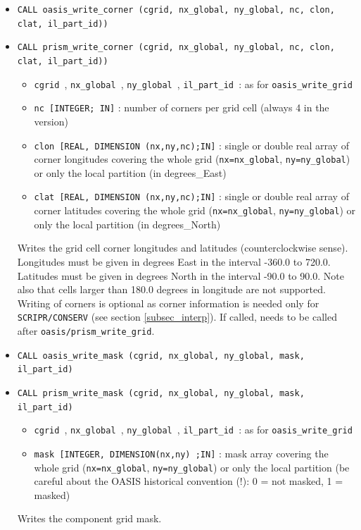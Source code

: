 \begin{itemize}
  \vspace{0.2cm}
\item {\tt CALL oasis\_write\_corner (cgrid, nx\_global, ny\_global, nc, clon, clat, il\_part\_id))}
\item {\tt CALL prism\_write\_corner (cgrid, nx\_global, ny\_global, nc, clon, clat, il\_part\_id))}

  \begin{itemize}
  \item {\tt cgrid }, {\tt nx\_global }, {\tt ny\_global }, {\tt il\_part\_id }: as for {\tt oasis\_write\_grid}

  \item {\tt nc [INTEGER; IN]} : number of corners per grid cell
    (always 4 in the version)
  \item {\tt clon [REAL, DIMENSION (nx,ny,nc);IN]} : single or double real array of corner
    longitudes covering the whole grid ({\tt nx=nx\_global}, {\tt ny=ny\_global}) or only the local partition (in degrees\_East)
  \item {\tt clat [REAL, DIMENSION (nx,ny,nc);IN]} : single or double real array of corner
    latitudes covering the whole grid ({\tt nx=nx\_global}, {\tt ny=ny\_global}) or only the local partition (in degrees\_North)
  \end{itemize}

  Writes the grid cell corner longitudes and latitudes
  (counterclockwise sense). Longitudes must be given in degrees East
  in the interval -360.0 to 720.0. Latitudes must be given in degrees
  North in the interval -90.0 to 90.0. Note also that cells larger
  than 180.0 degrees in longitude are not supported. Writing of
  corners is optional as corner information is needed only for {\tt
    SCRIPR/CONSERV} (see section \ref{subsec_interp}). If called,
  needs to be called after {\tt oasis/prism\_write\_grid}.

  \vspace{0.2cm}
\item {\tt CALL oasis\_write\_mask (cgrid, nx\_global, ny\_global, mask, il\_part\_id)}
\item {\tt CALL prism\_write\_mask (cgrid, nx\_global, ny\_global, mask, il\_part\_id)}

  \begin{itemize}
  \item {\tt cgrid }, {\tt nx\_global }, {\tt ny\_global }, {\tt il\_part\_id }: as for {\tt oasis\_write\_grid}
  \item {\tt mask [INTEGER, DIMENSION(nx,ny) ;IN]} : mask array covering the whole grid ({\tt nx=nx\_global}, {\tt ny=ny\_global}) or only the local partition (be
    careful about the OASIS historical convention (!): 0 = not masked,
    1 = masked)
  \end{itemize}
  Writes the component grid mask.


\end{itemize}
